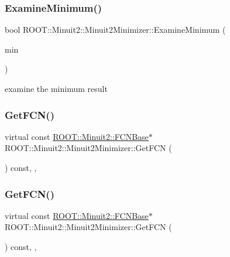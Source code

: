 \subsubsection{\texorpdfstring{ExamineMinimum()}{ExamineMinimum()}\hspace{0.1cm}{\footnotesize\ttfamily [2/2]}}
{\footnotesize\ttfamily bool R\+O\+O\+T\+::\+Minuit2\+::\+Minuit2\+Minimizer\+::\+Examine\+Minimum (\begin{DoxyParamCaption}\item[{const \mbox{\hyperlink{classROOT_1_1Minuit2_1_1FunctionMinimum}{R\+O\+O\+T\+::\+Minuit2\+::\+Function\+Minimum}} \&}]{min }\end{DoxyParamCaption})\hspace{0.3cm}{\ttfamily [protected]}}



examine the minimum result 

\mbox{\label{classROOT_1_1Minuit2_1_1Minuit2Minimizer_aee4d274acbb0db4702010a62ebdd4d56}} 
\subsubsection{\texorpdfstring{GetFCN()}{GetFCN()}\hspace{0.1cm}{\footnotesize\ttfamily [1/2]}}
{\footnotesize\ttfamily virtual const \mbox{\hyperlink{classROOT_1_1Minuit2_1_1FCNBase}{R\+O\+O\+T\+::\+Minuit2\+::\+F\+C\+N\+Base}}$\ast$ R\+O\+O\+T\+::\+Minuit2\+::\+Minuit2\+Minimizer\+::\+Get\+F\+CN (\begin{DoxyParamCaption}{ }\end{DoxyParamCaption}) const\hspace{0.3cm}{\ttfamily [inline]}, {\ttfamily [protected]}, {\ttfamily [virtual]}}

\mbox{\label{classROOT_1_1Minuit2_1_1Minuit2Minimizer_aee4d274acbb0db4702010a62ebdd4d56}} 
\subsubsection{\texorpdfstring{GetFCN()}{GetFCN()}\hspace{0.1cm}{\footnotesize\ttfamily [2/2]}}
{\footnotesize\ttfamily virtual const \mbox{\hyperlink{classROOT_1_1Minuit2_1_1FCNBase}{R\+O\+O\+T\+::\+Minuit2\+::\+F\+C\+N\+Base}}$\ast$ R\+O\+O\+T\+::\+Minuit2\+::\+Minuit2\+Minimizer\+::\+Get\+F\+CN (\begin{DoxyParamCaption}{ }\end{DoxyParamCaption}) const\hspace{0.3cm}{\ttfamily [inline]}, {\ttfamily [protected]}, {\ttfamily [virtual]}}

